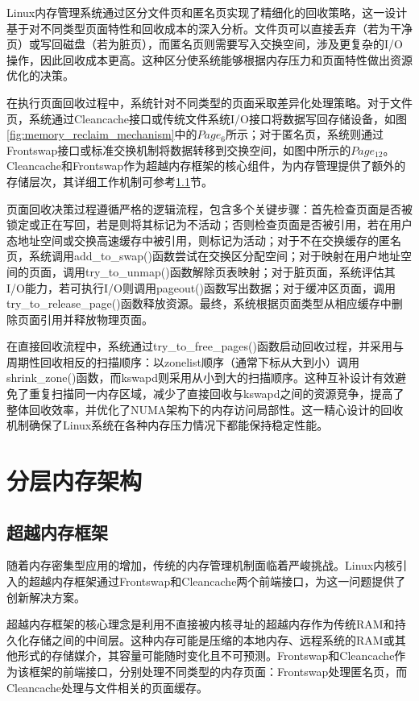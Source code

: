 Linux内存管理系统通过区分文件页和匿名页实现了精细化的回收策略，这一设计基于对不同类型页面特性和回收成本的深入分析。文件页可以直接丢弃（若为干净页）或写回磁盘（若为脏页），而匿名页则需要写入交换空间，涉及更复杂的I/O操作，因此回收成本更高。这种区分使系统能够根据内存压力和页面特性做出资源优化的决策。

在执行页面回收过程中，系统针对不同类型的页面采取差异化处理策略。对于文件页，系统通过Cleancache接口或传统文件系统I/O接口将数据写回存储设备，如图\ref{fig:memory_reclaim_mechanism}中的$Page_{6}$所示；对于匿名页，系统则通过Frontswap接口或标准交换机制将数据转移到交换空间，如图中所示的$Page_{12}$。Cleancache和Frontswap作为超越内存框架的核心组件，为内存管理提供了额外的存储层次，其详细工作机制可参考\ref{sec:超越内存框架}节。

页面回收决策过程遵循严格的逻辑流程，包含多个关键步骤：首先检查页面是否被锁定或正在写回，若是则将其标记为不活动；否则检查页面是否被引用，若在用户态地址空间或交换高速缓存中被引用，则标记为活动；对于不在交换缓存的匿名页，系统调用add\_to\_swap()函数尝试在交换区分配空间；对于映射在用户地址空间的页面，调用try\_to\_unmap()函数解除页表映射；对于脏页面，系统评估其I/O能力，若可执行I/O则调用pageout()函数写出数据；对于缓冲区页面，调用try\_to\_release\_page()函数释放资源。最终，系统根据页面类型从相应缓存中删除页面引用并释放物理页面。

在直接回收流程中，系统通过try\_to\_free\_pages()函数启动回收过程，并采用与周期性回收相反的扫描顺序：以zonelist顺序（通常下标从大到小）调用shrink\_zone()函数，而kswapd则采用从小到大的扫描顺序。这种互补设计有效避免了重复扫描同一内存区域，减少了直接回收与kswapd之间的资源竞争，提高了整体回收效率，并优化了NUMA架构下的内存访问局部性。这一精心设计的回收机制确保了Linux系统在各种内存压力情况下都能保持稳定性能。

\section{分层内存架构}

\subsection{超越内存框架}
\label{sec:超越内存框架}
随着内存密集型应用的增加，传统的内存管理机制面临着严峻挑战。Linux内核引入的超越内存框架通过Frontswap和Cleancache两个前端接口，为这一问题提供了创新解决方案。

超越内存框架的核心理念是利用不直接被内核寻址的超越内存作为传统RAM和持久化存储之间的中间层。这种内存可能是压缩的本地内存、远程系统的RAM或其他形式的存储媒介，其容量可能随时变化且不可预测。Frontswap和Cleancache作为该框架的前端接口，分别处理不同类型的内存页面：Frontswap处理匿名页，而Cleancache处理与文件相关的页面缓存。

